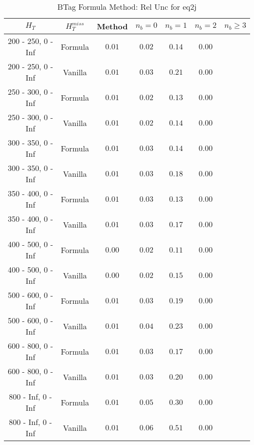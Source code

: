 \begin{longtable}{ | c | c | c | c | c | c | c | }
\caption{BTag Formula Method: Rel Unc for eq2j} \label{tab:eq2j} \\    \hline 
$H_{T}$ & $H_{T}^{miss}$ & Method & $n_{b} = 0$ & $n_{b} = 1$ & $n_{b} = 2$ & $n_{b} \ge 3$ \\ \hline 200 -  250,    0 -  Inf & Formula  & $  0.01 $ & $  0.02 $ & $  0.14 $ & $  0.00 $  \\  
 200 -  250,    0 -  Inf & Vanilla  & $  0.01 $ & $  0.03 $ & $  0.21 $ & $  0.00 $  \\ \hline 
 250 -  300,    0 -  Inf & Formula  & $  0.01 $ & $  0.02 $ & $  0.13 $ & $  0.00 $  \\  
 250 -  300,    0 -  Inf & Vanilla  & $  0.01 $ & $  0.02 $ & $  0.14 $ & $  0.00 $  \\ \hline 
 300 -  350,    0 -  Inf & Formula  & $  0.01 $ & $  0.03 $ & $  0.14 $ & $  0.00 $  \\  
 300 -  350,    0 -  Inf & Vanilla  & $  0.01 $ & $  0.03 $ & $  0.18 $ & $  0.00 $  \\ \hline 
 350 -  400,    0 -  Inf & Formula  & $  0.01 $ & $  0.03 $ & $  0.13 $ & $  0.00 $  \\  
 350 -  400,    0 -  Inf & Vanilla  & $  0.01 $ & $  0.03 $ & $  0.17 $ & $  0.00 $  \\ \hline 
 400 -  500,    0 -  Inf & Formula  & $  0.00 $ & $  0.02 $ & $  0.11 $ & $  0.00 $  \\  
 400 -  500,    0 -  Inf & Vanilla  & $  0.00 $ & $  0.02 $ & $  0.15 $ & $  0.00 $  \\ \hline 
 500 -  600,    0 -  Inf & Formula  & $  0.01 $ & $  0.03 $ & $  0.19 $ & $  0.00 $  \\  
 500 -  600,    0 -  Inf & Vanilla  & $  0.01 $ & $  0.04 $ & $  0.23 $ & $  0.00 $  \\ \hline 
 600 -  800,    0 -  Inf & Formula  & $  0.01 $ & $  0.03 $ & $  0.17 $ & $  0.00 $  \\  
 600 -  800,    0 -  Inf & Vanilla  & $  0.01 $ & $  0.03 $ & $  0.20 $ & $  0.00 $  \\ \hline 
 800 -  Inf,    0 -  Inf & Formula  & $  0.01 $ & $  0.05 $ & $  0.30 $ & $  0.00 $  \\  
 800 -  Inf,    0 -  Inf & Vanilla  & $  0.01 $ & $  0.06 $ & $  0.51 $ & $  0.00 $  \\ \hline 
    \hline 
    \hline 
\end{longtable}
